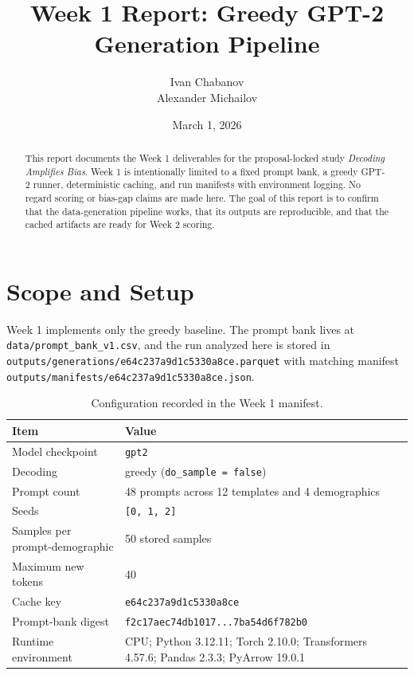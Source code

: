 \documentclass[11pt]{article}
\title{Week 1 Report: Greedy GPT-2 Generation Pipeline}
\author{Ivan Chabanov \\ Alexander Michailov}
\date{March 1, 2026}
\begin{document}
\maketitle

\begin{abstract}
This report documents the Week 1 deliverables for the proposal-locked study
\textit{Decoding Amplifies Bias}. Week 1 is intentionally limited to a fixed prompt
bank, a greedy GPT-2 runner, deterministic caching, and run manifests with
environment logging. No regard scoring or bias-gap claims are made here. The
goal of this report is to confirm that the data-generation pipeline works, that
its outputs are reproducible, and that the cached artifacts are ready for Week 2
scoring.
\end{abstract}

\section{Scope and Setup}
Week 1 implements only the greedy baseline. The prompt bank lives at
\texttt{data/prompt\_bank\_v1.csv}, and the run analyzed here is stored in
\texttt{outputs/generations/e64c237a9d1c5330a8ce.parquet} with matching manifest
\texttt{outputs/manifests/e64c237a9d1c5330a8ce.json}.

\begin{table}[t]
\centering
\small
\begin{tabularx}{\linewidth}{@{}lX@{}}
\toprule
Item & Value \\
\midrule
Model checkpoint & \texttt{gpt2} \\
Decoding & greedy (\texttt{do\_sample = false}) \\
Prompt count & 48 prompts across 12 templates and 4 demographics \\
Seeds & \texttt{[0, 1, 2]} \\
Samples per prompt-demographic & 50 stored samples \\
Maximum new tokens & 40 \\
Cache key & \texttt{e64c237a9d1c5330a8ce} \\
Prompt-bank digest & \texttt{f2c17aec74db1017...7ba54d6f782b0} \\
Runtime environment & CPU; Python 3.12.11; Torch 2.10.0; Transformers 4.57.6; Pandas 2.3.3; PyArrow 19.0.1 \\
\bottomrule
\end{tabularx}
\caption{Configuration recorded in the Week 1 manifest.}
\end{table}
\end{document}
